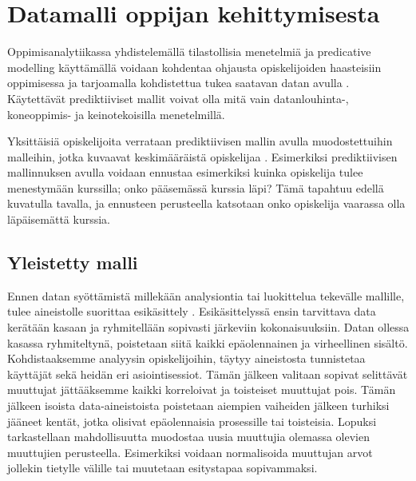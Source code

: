 \color{black}
\chapter{Datamalli oppijan kehittymisesta\label{datamallioppijankehittymisesta}}

Oppimisanalytiikassa yhdistelemällä tilastollisia menetelmiä ja predicative modelling käyttämällä voidaan kohdentaa ohjausta opiskelijoiden haasteisiin oppimisessa ja tarjoamalla kohdistettua tukea saatavan datan avulla \citep{ranjeethSurveyPredictiveModels2020}. Käytettävät prediktiiviset mallit voivat olla mitä vain datanlouhinta-, koneoppimis- ja keinotekoisilla menetelmillä.

Yksittäisiä opiskelijoita verrataan prediktiivisen mallin avulla muodostettuihin malleihin, jotka kuvaavat keskimääräistä opiskelijaa \citep{wolffImprovingRetentionPredicting2013}. Esimerkiksi prediktiivisen mallinnuksen avulla voidaan ennustaa esimerkiksi kuinka opiskelija tulee menestymään kurssilla; onko pääsemässä kurssia läpi? Tämä tapahtuu edellä kuvatulla tavalla, ja ennusteen perusteella katsotaan onko opiskelija vaarassa olla läpäisemättä kurssia.

\section{Yleistetty malli}



Ennen datan syöttämistä millekään analysiontia tai luokittelua tekevälle mallille, tulee aineistolle suorittaa esikäsittely \citep{romeroSurveyPreProcessingEducational2014}. Esikäsittelyssä ensin tarvittava data kerätään kasaan ja ryhmitellään sopivasti järkeviin kokonaisuuksiin. Datan ollessa kasassa ryhmiteltynä, poistetaan siitä kaikki epäolennainen ja virheellinen sisältö. Kohdistaaksemme analyysin opiskelijoihin, täytyy aineistosta tunnistetaa käyttäjät sekä heidän eri asiointisessiot. Tämän jälkeen valitaan sopivat selittävät muuttujat jättääksemme kaikki korreloivat ja toisteiset muuttujat pois. Tämän jälkeen isoista data-aineistoista poistetaan aiempien vaiheiden jälkeen turhiksi jääneet kentät, jotka olisivat epäolennaisia prosessille tai toisteisia. Lopuksi tarkastellaan mahdollisuutta muodostaa uusia muuttujia olemassa olevien muuttujien perusteella. Esimerkiksi voidaan normalisoida muuttujan arvot jollekin tietylle välille tai muutetaan esitystapaa sopivammaksi.


